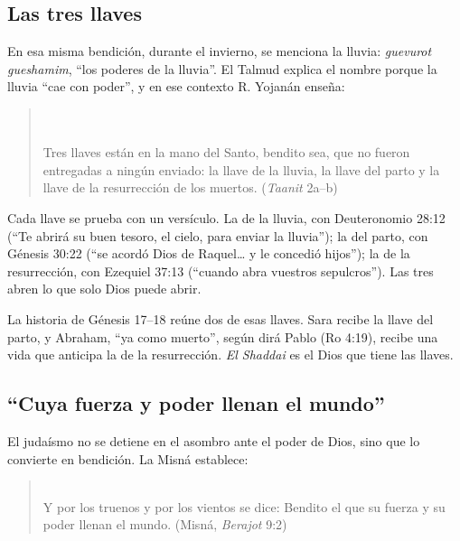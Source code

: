 
\subsection{Las tres llaves}

En esa misma bendición, durante el invierno, se menciona la lluvia: \emph{guevurot gueshamim}, ``los poderes de la lluvia''. El Talmud explica el nombre porque la lluvia ``cae con poder'', y en ese contexto R. Yojanán enseña:

\begin{quote}\small
{}\\
\\
Tres llaves están en la mano del Santo, bendito sea, que no fueron entregadas a ningún enviado: la llave de la lluvia, la llave del parto y la llave de la resurrección de los muertos. (\emph{Taanit} 2a--b)
\end{quote}

Cada llave se prueba con un versículo. La de la lluvia, con Deuteronomio 28:12 (``Te abrirá \SENOR{} su buen tesoro, el cielo, para enviar la lluvia''); la del parto, con Génesis 30:22 (``se acordó Dios de Raquel\ldots{} y le concedió hijos''); la de la resurrección, con Ezequiel 37:13 (``cuando abra vuestros sepulcros''). Las tres abren lo que solo Dios puede abrir.

La historia de Génesis 17--18 reúne dos de esas llaves. Sara recibe la llave del parto, y Abraham, ``ya como muerto'', según dirá Pablo (Ro 4:19), recibe una vida que anticipa la de la resurrección. \emph{El Shaddai} es el Dios que tiene las llaves.

\subsection{“Cuya fuerza y poder llenan el mundo”}

El judaísmo no se detiene en el asombro ante el poder de Dios, sino que lo convierte en bendición. La Misná establece:

\begin{quote}\small
{}\\
Y por los truenos y por los vientos se dice: Bendito el que su fuerza y su poder llenan el mundo. (Misná, \emph{Berajot} 9:2)
\end{quote}


